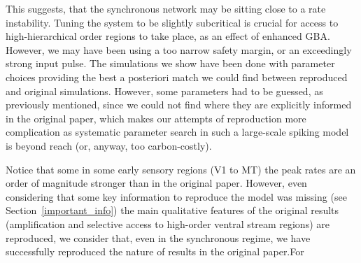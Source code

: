 This suggests, that the synchronous network may be sitting close to a rate instability. Tuning the system to be slightly subcritical is crucial for access to high-hierarchical order regions to take place, as an effect of enhanced GBA. However, we may have been using a too narrow safety margin, or an exceedingly strong input pulse. The simulations we show have been done with parameter choices providing the best a posteriori match we could find between reproduced and original simulations. However, some parameters had to be guessed, as previously mentioned, since we could not find where they are explicitly informed in the original paper, which makes our attempts of reproduction more complication as systematic parameter search in such a large-scale spiking model is beyond reach (or, anyway, too carbon-costly).

Notice that some in some early sensory regions (V1 to MT) the peak rates are an order of magnitude stronger than in the original paper. However, even considering that some key information to reproduce the model was missing (see Section~\ref{important_info}) the main qualitative features of the original results (amplification and selective access to high-order ventral stream regions) are reproduced, we consider that, even in the synchronous regime, we have successfully reproduced the nature of results in the original paper.For

